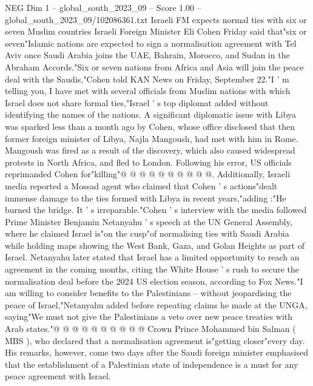 \begin{textsample}{NEG Dim 1 – global\_south\_2023\_09 – Score 1.00 – global\_south\_2023\_09/102086361.txt}  \label{ex:f1_neg_002}
Israeli FM expects normal ties with six or seven Muslim countries Israeli Foreign Minister Eli Cohen Friday said that"six or seven"Islamic nations are expected to sign a normalisation agreement with Tel Aviv once Saudi Arabia joins the UAE, Bahrain, Morocco, and Sudan in the Abraham Accords."Six or seven nations from Africa and Asia will join the peace deal with the Saudis,"Cohen told KAN News on Friday, September 22."I ' m telling you, I have met with several officials from Muslim nations with which Israel does not share formal ties,"Israel ' s top diplomat added without identifying the names of the nations.
A significant diplomatic issue with Libya was sparked less than a month ago by Cohen, whose office disclosed that then former foreign minister of Libya, Najla Mangoush, had met with him in Rome.
Mangoush was fired as a result of the discovery, which also caused widespread protests in North Africa, and fled to London.
Following his error, US officials reprimanded Cohen for"killing"@ @ @ @ @ @ @ @ @ @.
Additionally, Israeli media reported a Mossad agent who claimed that Cohen ' s actions"dealt immense damage to the ties formed with Libya in recent years,"adding :"He burned the bridge.
It ' s irreparable."Cohen ' s interview with the media followed Prime Minister Benjamin Netanyahu ' s speech at the UN General Assembly, where he claimed Israel is"on the cusp"of normalising ties with Saudi Arabia while holding maps showing the West Bank, Gaza, and Golan Heights as part of Israel.
Netanyahu later stated that Israel has a limited opportunity to reach an agreement in the coming months, citing the White House ' s rush to secure the normalisation deal before the 2024 US election season, according to Fox News."I am willing to consider benefits to the Palestinians -- without jeopardising the peace of Israel,"Netanyahu added before repeating claims he made at the UNGA, saying"We must not give the Palestinians a veto over new peace treaties with Arab states."@ @ @ @ @ @ @ @ @ @ Crown Prince Mohammed bin Salman ( MBS ), who declared that a normalisation agreement is"getting closer"every day.
His remarks, however, come two days after the Saudi foreign minister emphasised that the establishment of a Palestinian state of independence is a must for any peace agreement with Israel.

\end{textsample}
